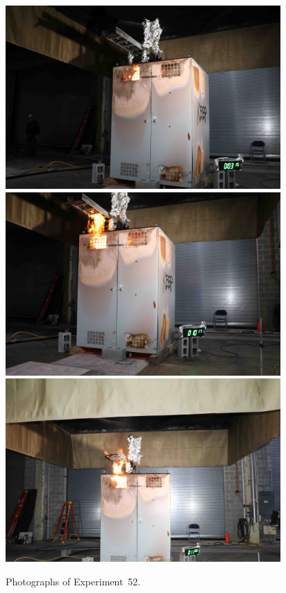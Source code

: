 \documentclass[12pt]{article}
\begin{document}
\begin{figure}[p]
\centering
\includegraphics[height=2.75in]{../FIGURES/Test_52_3_min_15_s} \\
\includegraphics[height=2.75in]{../FIGURES/Test_52_10_min_17_s} \\
\includegraphics[height=2.75in]{../FIGURES/Test_52_11_min_50_s}
\caption[Photographs of Experiment~52]{Photographs of Experiment~52.}
\label{fig:Test_52_photos}
\end{figure}


\clearpage
\end{document}
